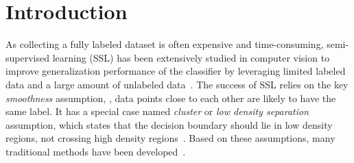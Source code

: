\documentclass[10pt,twocolumn,letterpaper]{article}
\begin{document}
\section{Introduction}
\label{sec:intro}
As collecting a fully labeled dataset is often expensive and time-consuming, semi-supervised learning (SSL) has been extensively studied in computer vision to improve generalization performance of the classifier by leveraging limited labeled data and a large amount of unlabeled data~\cite{chapelle2009semi}.
The success of SSL relies on the key \emph{smoothness} assumption, \ie, data points close to each other are likely to have the same label. It has a special case named \emph{cluster} or \emph{low density separation} assumption, which states that the decision boundary should lie in low density regions, not crossing high density regions~\cite{chapelle2005semi}. Based on these assumptions, many traditional methods have been developed~\cite{joachims1999transductive,zhu2003semi,zhou2004learning,chapelle2005semi,belkin2006manifold}.

\end{document}
